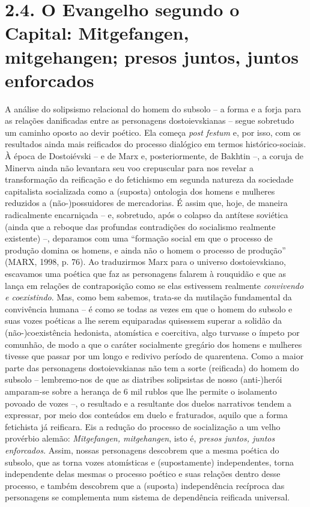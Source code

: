 \section{2.4. O Evangelho segundo o Capital: Mitgefangen, mitgehangen; presos juntos, juntos enforcados}

A análise do solipsismo relacional do homem do subsolo -- a forma e a
forja para as relações danificadas entre as personagens dostoievskianas
-- segue sobretudo um caminho oposto ao devir poético. Ela começa
\emph{post festum} e, por isso, com os resultados ainda mais reificados
do processo dialógico em termos histórico-sociais. À época de
Dostoiévski -- e de Marx e, posteriormente, de Bakhtin --, a coruja de
Minerva ainda não levantara seu voo crepuscular para nos revelar a
transformação da reificação e do fetichismo em segunda natureza da
sociedade capitalista socializada como a (suposta) ontologia dos homens
e mulheres reduzidos a (não-)possuidores de mercadorias. É assim que,
hoje, de maneira radicalmente encarniçada -- e, sobretudo, após o
colapso da antítese soviética (ainda que a reboque das profundas
contradições do socialismo realmente existente) --, deparamos com uma
``formação social em que o processo de produção domina os homens, e
ainda não o homem o processo de produção'' (MARX, 1998, p. 76). Ao
traduzirmos Marx para o universo dostoievskiano, escavamos uma poética
que faz as personagens falarem à rouquidão e que as lança em relações de
contraposição como se elas estivessem realmente \emph{convivendo e
coexistindo}. Mas, como bem sabemos, trata-se da mutilação fundamental
da convivência humana -- é como se todas as vezes em que o homem do
subsolo e suas vozes poéticas a lhe serem equiparadas quisessem superar
a solidão da (não-)coexistência hedonista, atomística e coercitiva, algo
turvasse o ímpeto por comunhão, de modo a que o caráter socialmente
gregário dos homens e mulheres tivesse que passar por um longo e
redivivo período de quarentena. Como a maior parte das personagens
dostoievskianas não tem a sorte (reificada) do homem do subsolo --
lembremo-nos de que as diatribes solipsistas de nosso (anti-)herói
amparam-se sobre a herança de 6 mil rublos que lhe permite o isolamento
povoado de vozes --, o resultado e a resultante dos duelos narrativos
tendem a expressar, por meio dos conteúdos em duelo e fraturados, aquilo
que a forma fetichista já reificara. Eis a redução do processo de
socialização a um velho provérbio alemão: \emph{Mitgefangen,
mitgehangen}, isto é, \emph{presos juntos, juntos enforcados.} Assim,
nossas personagens descobrem que a mesma poética do subsolo, que as
torna vozes atomísticas e (supostamente) independentes, torna
independente delas mesmas o processo poético e suas relações dentro
desse processo, e também descobrem que a (suposta) independência
recíproca das personagens se complementa num sistema de dependência
reificada universal.

